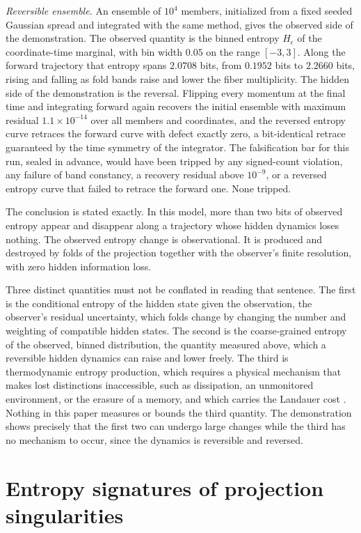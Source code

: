 \documentclass[aps,pre,reprint,nofootinbib]{revtex4-2}
\begin{document}
\emph{Reversible ensemble.}  An ensemble of $10^4$ members, initialized
from a fixed seeded Gaussian spread and integrated with the same method,
gives the observed side of the demonstration.  The observed quantity is the
binned entropy $H_\epsilon$ of the coordinate-time marginal, with bin width
$0.05$ on the range $[-3, 3]$.  Along the forward trajectory that entropy
spans $2.0708$ bits, from $0.1952$ bits to $2.2660$ bits, rising and
falling as fold bands raise and lower the fiber multiplicity.  The hidden
side of the demonstration is the reversal.  Flipping every momentum at the
final time and integrating forward again recovers the initial ensemble
with maximum residual $1.1 \times 10^{-14}$ over all members and
coordinates, and the reversed entropy curve retraces the forward curve
with defect exactly zero, a bit-identical retrace guaranteed by the
time symmetry of the integrator.  The falsification bar for this run,
sealed in advance, would have been tripped by any signed-count violation,
any failure of band constancy, a recovery residual above $10^{-9}$, or a
reversed entropy curve that failed to retrace the forward one.  None
tripped.

The conclusion is stated exactly.  In this model, more than two bits of
observed entropy appear and disappear along a trajectory whose hidden
dynamics loses nothing.  The observed entropy change is observational.  It
is produced and destroyed by folds of the projection together with the
observer's finite resolution, with zero hidden information loss.

Three distinct quantities must not be conflated in reading that sentence.
The first is the conditional entropy of the hidden state given the
observation, the observer's residual uncertainty, which folds change by
changing the number and weighting of compatible hidden states.  The second
is the coarse-grained entropy of the observed, binned distribution, the
quantity measured above, which a reversible hidden dynamics can raise and
lower freely.  The third is thermodynamic entropy production, which
requires a physical mechanism that makes lost distinctions inaccessible,
such as dissipation, an unmonitored environment, or the erasure of a
memory, and which carries the Landauer cost
\cite{Landauer1961,Bennett1982}.  Nothing in this paper measures or bounds
the third quantity.  The demonstration shows precisely that the first two
can undergo large changes while the third has no mechanism to occur, since
the dynamics is reversible and reversed.

\section{Entropy signatures of projection singularities}
\label{sec:signatures}
\end{document}
